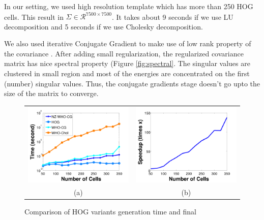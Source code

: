 \documentclass[10pt,twocolumn,letterpaper]{article}
\begin{document}

In our setting, we used high resolution template which has more than 250 HOG cells. This result in $\Sigma \in \mathcal{R}^{7500 \times 7500}$. It takes about 9 seconds if we use LU decomposition and 5 seconds if we use Cholesky decomposition.  %

We also used iterative Conjugate Gradient to make use of low rank property of the covariance \cite{Gharbi12}. After adding small regularization, the regularized covariance matrix has nice spectral property (Figure \ref{fig:spectral}. The singular values are clustered in small region and most of the energies are concentrated on the first (number) singular values. Thus, the conjugate gradients stage doesn't go upto the size of the matrix to converge.

\begin{figure}[t]
  \begin{center}
  \begin{tabular}{cc}
     \includegraphics[width=0.5\linewidth]{whotime} & 
     \includegraphics[width=0.5\linewidth]{speedup}\\
     (a) & (b) \\
 \end{tabular}
  \end{center}
  \caption{Comparison of HOG variants generation time and final }
  \label{fig:whotime}
\end{figure}
\end{document}

